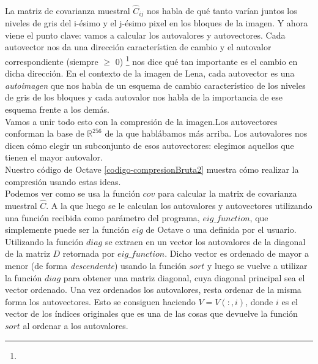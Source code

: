 \documentclass[twocolumn,a4paper,10pt]{article}
\begin{document}
\paragraph*{}

La matriz de covarianza muestral 
$\widehat{C}_{ij}$ nos habla de qu\'e tanto var\'ian juntos los niveles de gris del i-\'esimo y el j-\'esimo pixel en los bloques de la imagen. Y ahora viene 
el punto clave: vamos a calcular los autovalores y autovectores. Cada autovector nos da una direcci\'on caracter\'istica de cambio y el autovalor correspondiente 
(siempre $\geq$ 0) \footnote{}
 nos dice qu\'e tan importante es el cambio en dicha direcci\'on. En el contexto de la imagen de Lena, cada autovector es una \textit{autoimagen}
que nos habla de un esquema de cambio caracter\'istico de los niveles de gris de los bloques y cada autovalor nos habla de la importancia de ese esquema frente 
a los dem\'as. \\

Vamos a unir todo esto con la compresi\'on de la imagen.Los autovectores conforman la base de $\mathbb{R}^{256}$ de la que habl\'abamos m\'as arriba. 
Los autovalores nos dicen c\'omo elegir un subconjunto de esos autovectores: elegimos aquellos que tienen el mayor autovalor. \\

Nuestro c\'odigo de Octave \ref{codigo-compresionBruta2} muestra c\'omo realizar la compresi\'on usando estas ideas. \\

Podemos ver como se usa la función $cov$ para calcular la matrix de covarianza muestral $\widehat{C}$. A la que luego se le calculan los autovalores y autovectores
utilizando una funci\'on recibida como par\'ametro del programa, $eig\_function$, que simplemente puede ser la funci\'on $eig$ de Octave o una definida por el usuario.
Utilizando la función $diag$ se extraen en un vector los autovalores de la diagonal de la matriz $D$ retornada por $eig\_function$. Dicho vector es ordenado de 
mayor a menor (de forma \textit{descendente}) usando la funci\'on $sort$ y luego se vuelve a utilizar la funci\'on $diag$ para obtener una matriz diagonal, cuya 
diagonal principal sea el vector ordenado. Una vez ordenados los autovalores, resta ordenar de la misma forma los autovectores. Esto se consiguen haciendo $V = V(:,i)$,
donde $i$ es el vector de los \'indices originales que es una de las cosas que devuelve la funci\'on $sort$ al ordenar a los autovalores.\\
\end{document}

